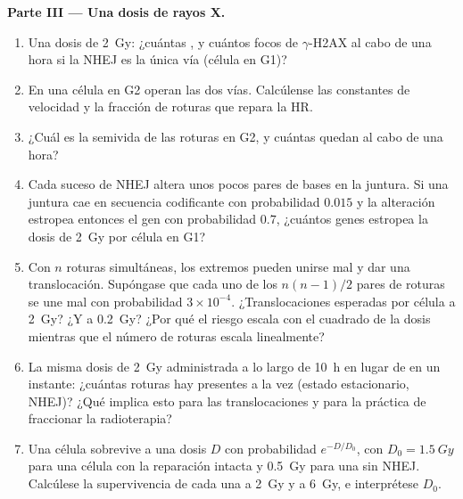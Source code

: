 \begin{problem}
\medskip
\noindent\textbf{Parte III --- Una dosis de rayos X.}
\begin{enumerate}[resume]
  \item Una dosis de \qty{2}{Gy}: ¿cuántas , y
        cuántos focos de $\gamma$-H2AX al cabo de una hora si la NHEJ es
        la única vía (célula en G1)?
  \item En una célula en G2 operan las dos vías. Calcúlense las
        constantes de velocidad y la fracción de roturas que repara la
        HR.
  \item ¿Cuál es la semivida de las roturas en G2, y cuántas quedan al
        cabo de una hora?
  \item Cada suceso de NHEJ altera unos pocos pares de bases en la
        juntura. Si una juntura cae en secuencia codificante con
        probabilidad $0.015$ y la alteración estropea entonces el gen con
        probabilidad $0.7$, ¿cuántos genes estropea la dosis de
        \qty{2}{Gy} por célula en G1?
  \item Con $n$ roturas simultáneas, los extremos pueden unirse mal y dar
        una translocación. Supóngase que cada uno de los $n(n-1)/2$ pares
        de roturas se une mal con probabilidad $3\times 10^{-4}$.
        ¿Translocaciones esperadas por célula a \qty{2}{Gy}? ¿Y a
        \qty{0.2}{Gy}? ¿Por qué el riesgo escala con el cuadrado de la
        dosis mientras que el número de roturas escala linealmente?
  \item La misma dosis de \qty{2}{Gy} administrada a lo largo de
        \qty{10}{h} en lugar de en un instante: ¿cuántas roturas hay
        presentes a la vez (estado estacionario, NHEJ)? ¿Qué implica esto
        para las translocaciones y para la práctica de fraccionar la
        radioterapia?
  \item Una célula sobrevive a una dosis $D$ con probabilidad
        $e^{-D/D_{0}}$, con $D_{0} = \qty{1.5}{Gy}$ para una célula con
        la reparación intacta y \qty{0.5}{Gy} para una sin NHEJ.
        Calcúlese la supervivencia de cada una a \qty{2}{Gy} y a
        \qty{6}{Gy}, e interprétese $D_{0}$.
\end{enumerate}


\end{problem}
